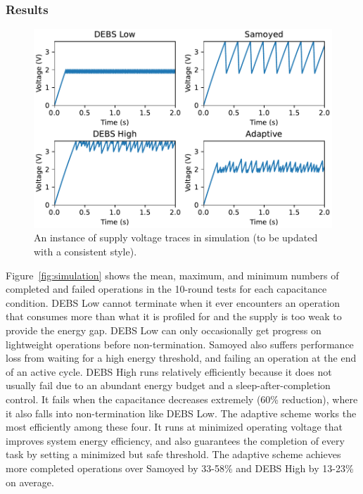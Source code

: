 \subsubsection{Results}

% 
% 

%



\begin{figure}[!t]
    \centering
    \includegraphics[width=\columnwidth]{ch5_optic/figures/voltage_traces.pdf}
    \caption{An instance of supply voltage traces in simulation (to be updated with a consistent style). }
    \label{fig:simulation_voltage}
\end{figure}



Figure~\ref{fig:simulation} shows the mean, maximum, and minimum numbers of completed and failed operations in the 10-round tests for each capacitance condition. 
DEBS Low cannot terminate when it ever encounters an operation that consumes more than what it is profiled for and the supply is too weak to provide the energy gap. 
DEBS Low can only occasionally get progress on lightweight operations before non-termination. 
Samoyed also suffers performance loss from waiting for a high energy threshold, and failing an operation at the end of an active cycle. 
DEBS High runs relatively efficiently because it does not usually fail due to an abundant energy budget and a sleep-after-completion control. 
It fails when the capacitance decreases extremely (60\% reduction), where it also falls into non-termination like DEBS Low.  
The adaptive scheme works the most efficiently among these four.
It runs at minimized operating voltage that improves system energy efficiency, and also guarantees the completion of every task by setting a minimized but safe threshold.
The adaptive scheme achieves more completed operations over Samoyed by 33-58\% and DEBS High by 13-23\% on average.

